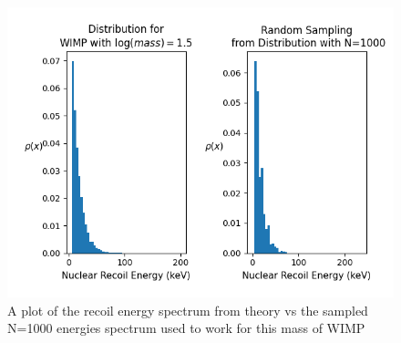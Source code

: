 \documentclass[11pt]{article} %
\begin{document}
\begin{figure}[H]
\centering
\includegraphics[scale=0.7]{images/Ar_c1dat_m1-5.png}
\caption{A plot of the recoil energy spectrum from theory vs the sampled N=1000 energies spectrum used to work for this mass of WIMP}
\label{fig:recoil}
\end{figure}
\end{document}
